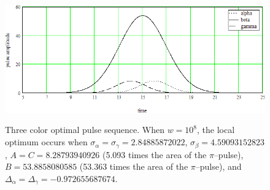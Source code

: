 \begin{figure}
\centering
\includegraphics[width=5.00in]
{solution_3_pulses/solution_3_pulses.png}\\
\caption[Three color optimal pulse sequence]{Three color optimal pulse sequence. When $w=10^8$, the local optimum occurs when $\sigma_\alpha=\sigma_\gamma=2.84885872022$, $\sigma_\beta=4.59093152823$, $A=C=8.28793940926$ (5.093 times the area of the $\pi$--pulse), $B=53.8858080585$ (53.363 times the area of the $\pi$--pulse), and $\Delta_\alpha=\Delta_\gamma=-0.972655687674$.}
\label{solution three pulses}
\end{figure} 
